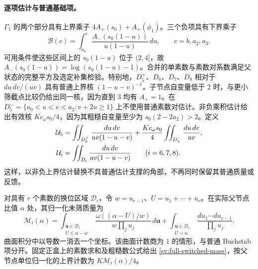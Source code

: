 \paragraph{逐项估计与普通基础项。}
$\Gamma_1$ 的两个部分具有上界乘子 $4A_+(s_0)+A_+(\phi_1)$。三个负项具有下界乘子
\begin{equation}\label{sv:negative-singleton-base}
 \mathcal B(c)=\int_{a_0}^{c}
   \frac{A_-(s_0(1-u))}{u(1-u)}\,du,
 \qquad c=b,a_2,a_3.
\end{equation}
可用条件使这些区间上的 $s_0(1-u)$ 位于 $(2,4]$，故 $A_-(s_0(1-u))=\log(s_0(1-u)-1)$。合并的单素数与素数对系数满足父状态的完整平方及选定补集检验。特别地，$D_5^+$、$D_6$、$D_7$、$D_8$ 相对于 $du\,dv/(uv)$ 具有普通上界核 $(1-u-v)^{-1}$。子节点自变量低于 $2$ 时，与更小筛截点比较仍给出同一核，因为直到 $3$ 均有 $A_+=1$。在 $D_5^-=\{a_0<u<v<a_2:v+2u\ge1\}$ 上不使用普通素数对估计。非负乘积估计给出有效核 $Kc_\omega s_0/4$，因为其粗糙自变量至少为 $s_0(2-2a_2)>2$。定义
\begin{align}\label{sv:pair-base}
 \mathcal U_5&=
  \iint_{D_5^+}\frac{du\,dv}{uv(1-u-v)}
   +\frac{Kc_\omega s_0}{4}\iint_{D_5^-}\frac{du\,dv}{uv},\notag\\
 \mathcal U_i&=\iint_{D_i}\frac{du\,dv}{uv(1-u-v)}
                  \qquad(i=6,7,8).
\end{align}
这样，以非负上界估计替换不具普通估计支撑的角部，不再同时保留其普通质量或反馈。

对具有 $r$ 个素数的换位区域 $\mathcal D_i$，令 $w=u_{r-1}$、$U=u_1+\cdots+u_r$。在实际父节点比值 $\alpha$ 处，其归一化未筛质量为
\begin{equation}\label{sv:full-switched-mass}
 \mathcal M_i(\alpha)=
 \int_{\substack{\boldsymbol u\in\mathcal D_i\\U\le\alpha-w}}
 \frac{\omega((\alpha-U)/w)}{w\prod_j u_j}\,d\boldsymbol u
 +\int_{\substack{\boldsymbol u\in\mathcal D_i\\U=\alpha}}
                     \frac{du_1\cdots du_{r-1}}{\prod_j u_j}.
\end{equation}
曲面积分中以导数一消去一个坐标。该曲面计数商为 $1$ 的情形，与普通 Buchstab 项分开。固定正盒上的素数求和及粗糙数公式给出 \eqref{sv:full-switched-mass}，按父节点单位归一化的上界计数为 $K\mathcal M_i(\alpha)/4$。

